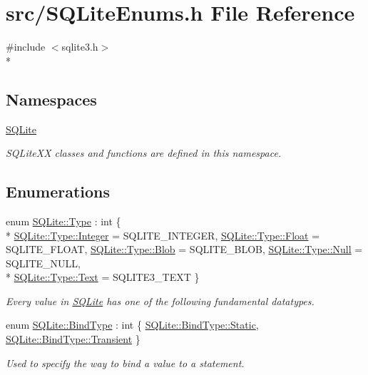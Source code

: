 \hypertarget{a00029}{\section{src/\-S\-Q\-Lite\-Enums.h File Reference}
\label{a00029}
}
{\ttfamily \#include $<$sqlite3.\-h$>$}\\*
\subsection*{Namespaces}
\begin{DoxyCompactItemize}
\item 
\hyperlink{a00038}{S\-Q\-Lite}
\begin{DoxyCompactList}\small\item\em S\-Q\-Lite\-X\-X classes and functions are defined in this namespace. \end{DoxyCompactList}\end{DoxyCompactItemize}
\subsection*{Enumerations}
\begin{DoxyCompactItemize}
\item 
enum \hyperlink{a00038_ad7a8ff5f375eca25eb6e3a51d746a04c}{S\-Q\-Lite\-::\-Type} \-: int \{ \\*
\hyperlink{a00038_ad7a8ff5f375eca25eb6e3a51d746a04caa0faef0851b4294c06f2b94bb1cb2044}{S\-Q\-Lite\-::\-Type\-::\-Integer} = S\-Q\-L\-I\-T\-E\-\_\-\-I\-N\-T\-E\-G\-E\-R, 
\hyperlink{a00038_ad7a8ff5f375eca25eb6e3a51d746a04ca22ae0e2b89e5e3d477f988cc36d3272b}{S\-Q\-Lite\-::\-Type\-::\-Float} = S\-Q\-L\-I\-T\-E\-\_\-\-F\-L\-O\-A\-T, 
\hyperlink{a00038_ad7a8ff5f375eca25eb6e3a51d746a04cae8016c85ada38bdc5fac616ec1318047}{S\-Q\-Lite\-::\-Type\-::\-Blob} = S\-Q\-L\-I\-T\-E\-\_\-\-B\-L\-O\-B, 
\hyperlink{a00038_ad7a8ff5f375eca25eb6e3a51d746a04cabbb93ef26e3c101ff11cdd21cab08a94}{S\-Q\-Lite\-::\-Type\-::\-Null} = S\-Q\-L\-I\-T\-E\-\_\-\-N\-U\-L\-L, 
\\*
\hyperlink{a00038_ad7a8ff5f375eca25eb6e3a51d746a04ca9dffbf69ffba8bc38bc4e01abf4b1675}{S\-Q\-Lite\-::\-Type\-::\-Text} = S\-Q\-L\-I\-T\-E3\-\_\-\-T\-E\-X\-T
 \}
\begin{DoxyCompactList}\small\item\em Every value in \hyperlink{a00038}{S\-Q\-Lite} has one of the following fundamental datatypes. \end{DoxyCompactList}\item 
enum \hyperlink{a00038_a32877e51b309dd8f2a28c21c0ba4a6fd}{S\-Q\-Lite\-::\-Bind\-Type} \-: int \{ \hyperlink{a00038_a32877e51b309dd8f2a28c21c0ba4a6fda84a8921b25f505d0d2077aeb5db4bc16}{S\-Q\-Lite\-::\-Bind\-Type\-::\-Static}, 
\hyperlink{a00038_a32877e51b309dd8f2a28c21c0ba4a6fdab1f023eff9a6b5308d6024e4c6b3d475}{S\-Q\-Lite\-::\-Bind\-Type\-::\-Transient}
 \}
\begin{DoxyCompactList}\small\item\em Used to specify the way to bind a value to a statement. \end{DoxyCompactList}\end{DoxyCompactItemize}
